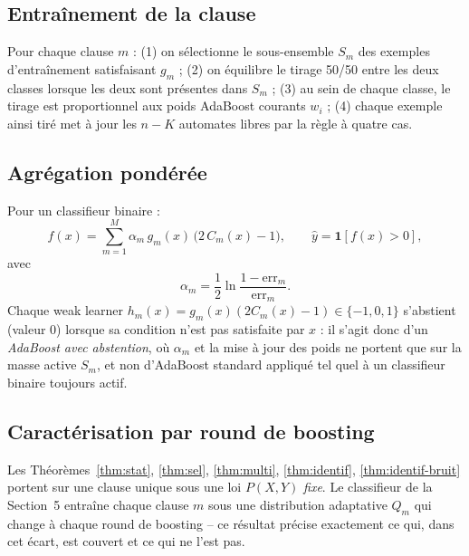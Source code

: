 \documentclass[12pt,a4paper]{article}
\begin{document}
\subsection{Entraînement de la clause}

Pour chaque clause $m$ : (1) on sélectionne le sous-ensemble $S_m$ des
exemples d'entraînement satisfaisant $g_m$ ; (2) on équilibre le tirage
50/50 entre les deux classes lorsque les deux sont présentes dans $S_m$ ;
(3) au sein de chaque classe, le tirage est proportionnel aux poids AdaBoost
courants $w_i$ ; (4) chaque exemple ainsi tiré met à jour les $n-K$
automates libres par la règle à quatre cas.

\subsection{Agrégation pondérée}

Pour un classifieur binaire :
\[
  f(x) = \sum_{m=1}^{M} \alpha_m\, g_m(x)\,\bigl(2\,C_m(x)-1\bigr), \qquad
  \hat y = \mathbf 1[f(x)>0],
\]
avec
\[
  \alpha_m = \frac12\ln\frac{1-\mathrm{err}_m}{\mathrm{err}_m}.
\]
Chaque weak learner $h_m(x)=g_m(x)(2C_m(x)-1)\in\{-1,0,1\}$ s'abstient
(valeur $0$) lorsque sa condition n'est pas satisfaite par $x$ : il s'agit
donc d'un \emph{AdaBoost avec abstention}, où $\alpha_m$ et la mise à jour
des poids ne portent que sur la masse active $S_m$, et non d'AdaBoost
standard appliqué tel quel à un classifieur binaire toujours actif.

\subsection{Caractérisation par round de boosting}\label{sec:round-boosting}

Les Théorèmes~\ref{thm:stat}, \ref{thm:sel}, \ref{thm:multi},
\ref{thm:identif}, \ref{thm:identif-bruit} portent sur une clause unique
sous une loi $P(X,Y)$ \emph{fixe}. Le classifieur de la Section~5 entraîne
chaque clause $m$ sous une distribution adaptative $Q_m$ qui change à
chaque round de boosting -- ce résultat précise exactement ce qui, dans
cet écart, est couvert et ce qui ne l'est pas.
\end{document}

